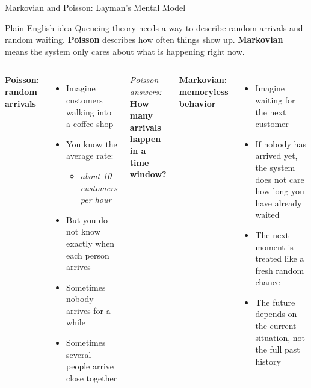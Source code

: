 \documentclass[aspectratio=169]{beamer}
\begin{document}
\begin{frame}{Markovian and Poisson: Layman's Mental Model}
\tiny

\begin{block}{Plain-English idea}
Queueing theory needs a way to describe random arrivals and random waiting.  
\textbf{Poisson} describes how often things show up.  
\textbf{Markovian} means the system only cares about what is happening right now.
\end{block}

\vspace{0.2cm}

\begin{columns}[T]

\textbf{Poisson: random arrivals}

\begin{itemize}
    \item Imagine customers walking into a coffee shop
    \item You know the average rate:
    \begin{itemize}
        \item \textit{about 10 customers per hour}
    \end{itemize}
    \item But you do not know exactly when each person arrives
    \item Sometimes nobody arrives for a while
    \item Sometimes several people arrive close together
\end{itemize}

\vspace{0.1cm}

\begin{center}
\textit{Poisson answers:}\\
\textbf{How many arrivals happen in a time window?}
\end{center}


\textbf{Markovian: memoryless behavior}

\begin{itemize}
    \item Imagine waiting for the next customer
    \item If nobody has arrived yet, the system does not care how long you have already waited
    \item The next moment is treated like a fresh random chance
    \item The future depends on the current situation, not the full past history
\end{itemize}


\end{columns}
\end{frame}
\end{document}
